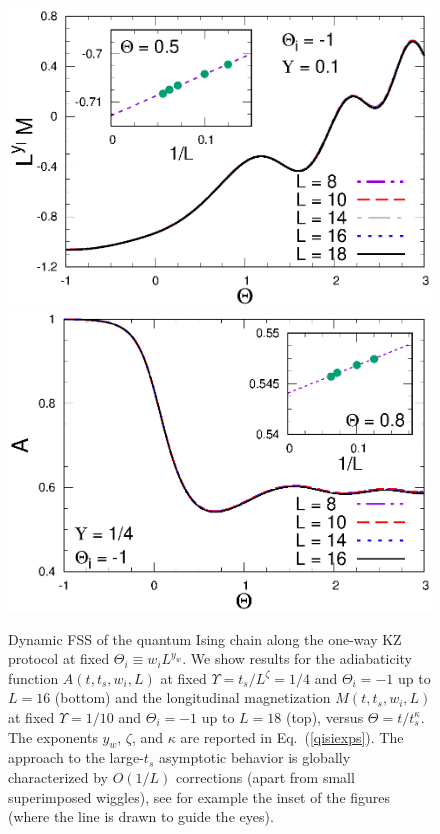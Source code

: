 \begin{figure}[!htb]
\centering
    \includegraphics[width=0.65\columnwidth]{imm/IQY01ThX.eps}
  \includegraphics[width=0.65\columnwidth]{imm/IQY14ThA.eps}
  \caption{Dynamic FSS of the quantum Ising chain along the one-way KZ
    protocol at fixed $\Theta_i\equiv w_i L^{y_w}$.  We show results
    for the adiabaticity function $A(t,t_s,w_i,L)$ at fixed
    $\Upsilon=t_s/L^\zeta=1/4$ and $\Theta_i=-1$ up to $L=16$ (bottom)
    and the longitudinal magnetization $M(t,t_s,w_i,L)$ at fixed
    $\Upsilon=1/10$ and $\Theta_i=-1$ up to $L=18$ (top), versus
    $\Theta = t/t_s^\kappa$. The exponents $y_w$, $\zeta$, and
    $\kappa$ are reported in Eq.~(\ref{qisiexps}).  The approach to
    the large-$t_s$ asymptotic behavior is globally characterized by
    $O(1/L)$ corrections (apart from small superimposed wiggles), see
    for example the inset of the figures (where the line is drawn to
    guide the eyes).  }
  \label{dfssthetai}
\end{figure}


